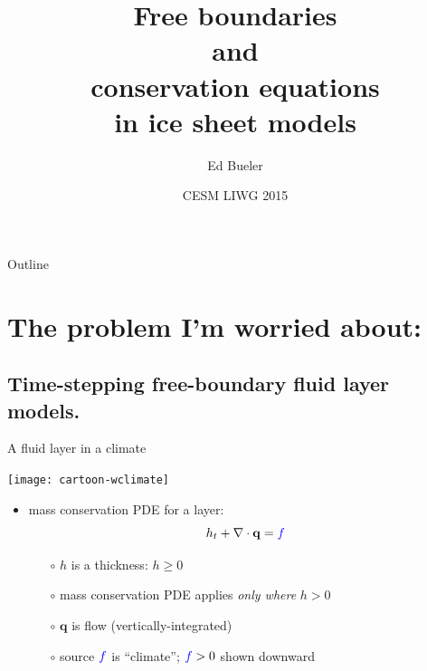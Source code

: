 \documentclass{beamer}
\title[Free boundaries and conservation equations] %
{Free boundaries \\ and \\ conservation equations \\  in ice sheet models}
\author{Ed Bueler}
\institute[UAF] %
{
  Dept of Mathematics and Statistics, and Geophysical Institute\\
  University of Alaska Fairbanks%
}
\date{CESM LIWG 2015}
\newcommand\bq{\mathbf{q}}
\newcommand{\Div}{\nabla\cdot}
\begin{document}
\graphicspath{{../cartoon/}{../refinemass/}{../../images/}{../../../talks-public/commonfigs/}}

\begin{frame}
  \titlepage
\end{frame}

\begin{frame}{Outline}
  \tableofcontents
\end{frame}


\section{The problem I'm worried about:}

\subsection{Time-stepping free-boundary fluid layer models.}

\begin{frame}{A fluid layer in a climate}

\begin{center}
\texttt{[image: cartoon-wclimate]}
\end{center}

\vspace{-7mm}
  \begin{itemize}
  \item mass conservation PDE for a layer:
      $$h_t + \Div\bq = {\color{blue} f}$$
    \begin{itemize}
    \vspace{-4mm}
    \item[$\circ$] $h$ is a thickness: $h\ge 0$
    \item[$\circ$] mass conservation PDE applies \emph{only where} $h>0$
    \item[$\circ$] $\bq$ is flow (vertically-integrated)
    \item[$\circ$] source ${\color{blue} f}$ is ``climate''; ${\color{blue} f}>0$ shown downward
    \end{itemize}
  \end{itemize}
\end{frame}
\end{document}
